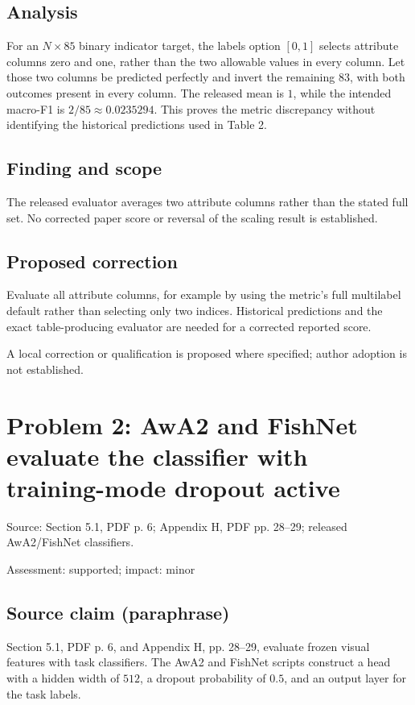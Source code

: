 \documentclass[11pt]{article}
\begin{document}
\subsection*{Analysis}

For an \(N\times85\) binary indicator target, the labels option \([0,1]\) selects attribute columns zero and one, rather than the two allowable values in every column. Let those two columns be predicted perfectly and invert the remaining \(83\), with both outcomes present in every column. The released mean is \(1\), while the intended macro-F1 is \(2/85\approx0.0235294\). This proves the metric discrepancy without identifying the historical predictions used in Table 2.

\subsection*{Finding and scope}

The released evaluator averages two attribute columns rather than the stated full set. No corrected paper score or reversal of the scaling result is established.

\subsection*{Proposed correction}

Evaluate all attribute columns, for example by using the metric's full multilabel default rather than selecting only two indices. Historical predictions and the exact table-producing evaluator are needed for a corrected reported score.

A local correction or qualification is proposed where specified; author adoption is not established.

\section*{Problem 2: AwA2 and FishNet evaluate the classifier with training-mode dropout active}

Source: Section 5.1, PDF p. 6; Appendix H, PDF pp. 28–29; released AwA2/FishNet classifiers.

Assessment: supported; impact: minor

\subsection*{Source claim (paraphrase)}

Section 5.1, PDF p. 6, and Appendix H, pp. 28–29, evaluate frozen visual features with task classifiers. The AwA2 and FishNet scripts construct a head with a hidden width of \(512\), a dropout probability of \(0.5\), and an output layer for the task labels.
\end{document}
